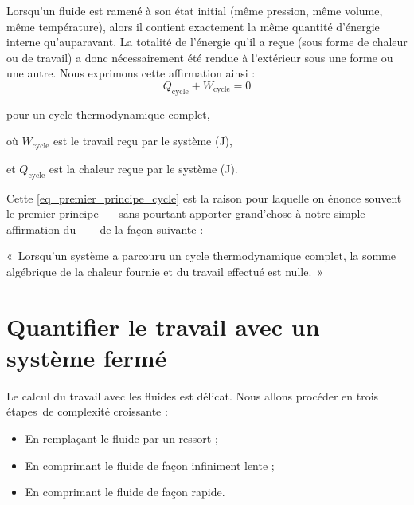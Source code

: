 	Lorsqu’un fluide est ramené à son état initial (même pression, même volume, même température), alors il contient exactement la même quantité d’énergie interne qu’auparavant. La totalité de l’énergie qu’il a reçue (sous forme de chaleur ou de travail) a donc nécessairement été rendue à l’extérieur sous une forme ou une autre. Nous exprimons cette affirmation ainsi :
	\begin{equation}
	Q_{\text{cycle}} + W_{\text{cycle}} = 0
	\label{eq_premier_principe_cycle}
	\end{equation}
	\begin{equationterms}
		\item pour un cycle thermodynamique complet,
		\item où \tab $W_\text{cycle}$ \tab est le travail reçu par le système (\si{\joule}),
		\item et \tab $Q_\text{cycle}$ \tab est la chaleur reçue par le système (\si{\joule}).
	\end{equationterms}

	Cette \cref{eq_premier_principe_cycle} est la raison pour laquelle on énonce souvent le premier principe —\ sans pourtant apporter grand’chose à notre simple affirmation du \coursunshort\ — de la façon suivante :

	«~Lorsqu’un système a parcouru un cycle thermodynamique complet, la somme algébrique de la chaleur fournie et du travail effectué est nulle.~»



\section[Quantifier le travail avec un système fermé]{Quantifier le travail avec un système\onlyamphibook{\\} fermé}

	Le calcul du travail avec les fluides est délicat. Nous allons procéder en trois étapes~de complexité croissante :

	\begin{itemize}
		\item En remplaçant le fluide par un ressort ;
		\item En comprimant le fluide de façon infiniment lente ;
		\item En comprimant le fluide de façon rapide.
	\end{itemize}



